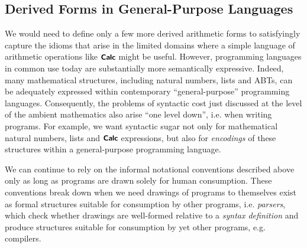 \subsection{Derived Forms in General-Purpose Languages}
We would need to define only a few more derived arithmetic forms to satisfyingly capture the  idioms that arise in the limited domains where a simple language of arithmetic operations like $\textsf{\textbf{\small Calc}}$ might be useful. %
However, programming languages in common use today are substantially more semantically expressive. Indeed, many mathematical structures, including natural numbers, lists and ABTs, can be adequately expressed within contemporary ``general-purpose'' programming languages. %
Consequently, the problems of syntactic cost just discussed at the level of the ambient mathematics also arise ``one level down'', i.e. when writing programs. For example, we want syntactic sugar not only for mathematical natural numbers, lists and $\textsf{\textbf{\small Calc}}$ expressions, but also for \emph{encodings} of these structures within a general-purpose programming language.%

We can continue to rely on the informal notational conventions described above only as long as programs are drawn solely for human consumption. These conventions break down when we need drawings of programs to themselves exist as formal structures suitable for consumption by other programs, i.e. \emph{parsers}, which check whether drawings are well-formed relative to a \emph{syntax definition} and produce structures suitable for consumption by yet other programs, e.g. compilers. %




